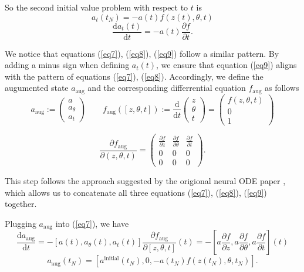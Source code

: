 \documentclass[a4paper,11pt,titlepage]{article}
\theoremstyle{definition}
\theoremstyle{plain}
\theoremstyle{remark}
\begin{document}
So the second initial value problem with respect to $t$ is 
$$a_t(t_N)=-a(t)f\left(z(t),\theta,t\right)$$
\begin{equation}\label{eq9}
    \frac{\mathrm{d}a_t(t)}{\mathrm{d}t} = -a(t)\frac{\partial f}{\partial t}.
\end{equation}

We notice that equations (\ref{eq7}), (\ref{eq8}), (\ref{eq9}) follow a similar pattern. By adding a minus sign when defining $a_t(t)$, we ensure that equation (\ref{eq9}) aligns with the pattern of equations (\ref{eq7}), (\ref{eq8}). Accordingly, we define the augumented state $a_{\mathrm{aug}}$ and the corresponding differrential equation $f_{\mathrm{aug}}$ as follows
$$a_{\mathrm{aug}}:= \begin{pmatrix}a\\ a_\theta\\ a_t\end{pmatrix}\quad\quad f_{\mathrm{aug}}\left([z,\theta,t]\right):=\frac{\mathrm{d}}{\mathrm{d}t}\begin{pmatrix}z\\\theta\\ t\end{pmatrix}=\begin{pmatrix}f(z,\theta,t)\\0\\1\end{pmatrix}$$

\[
\frac{\partial f_{\mathrm{aug}}}{\partial (z, \theta, t)} = 
\begin{pmatrix}
\frac{\partial f}{\partial z} & \frac{\partial f}{\partial \theta} & \frac{\partial f}{\partial t} \\
0 & 0 & 0 \\
0 & 0 & 0 
\end{pmatrix}.
\]

This step follows the approach suggested by the origional neural ODE paper \cite{chen2018neural}, which allows us to concatenate all three equations (\ref{eq7}), (\ref{eq8}), (\ref{eq9}) together. 

Plugging $a_{\mathrm{aug}}$ into (\ref{eq7}), we have
$$
\frac{\mathrm{d}a_{\mathrm{aug}}}{\mathrm{d}t} = -[a(t), a_\theta(t), a_t(t)]\frac{\partial f_{\mathrm{aug}}}{\partial [z,\theta,t]}(t)=-\left[a\frac{\partial f}{\partial z},a\frac{\partial f}{\partial \theta},a\frac{\partial f}{\partial t}\right](t)
$$
$$
a_{\mathrm{aug}}(t_N)=\left[a^{\mathrm{initial}}(t_N),0,-a(t_N)f(z(t_N),\theta, t_N)\right].
$$
\end{document}
